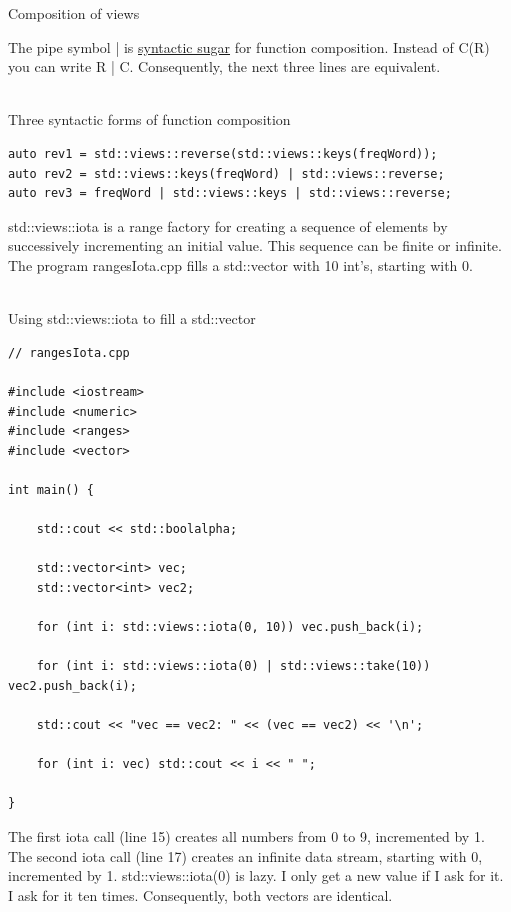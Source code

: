 \begin{center}
Composition of views
\end{center}

The pipe symbol | is \href{https://en.wikipedia.org/wiki/Syntactic_sugar}{syntactic sugar} for function composition. Instead of C(R) you can write R | C. Consequently, the next three lines are equivalent.

\hspace*{\fill} \\ %
\noindent
Three syntactic forms of function composition
\begin{lstlisting}[style=styleCXX]
auto rev1 = std::views::reverse(std::views::keys(freqWord));
auto rev2 = std::views::keys(freqWord) | std::views::reverse;
auto rev3 = freqWord | std::views::keys | std::views::reverse;
\end{lstlisting}


std::views::iota is a range factory for creating a sequence of elements by successively incrementing an initial value. This sequence can be finite or infinite. The program rangesIota.cpp fills a std::vector with 10 int’s, starting with 0.

\hspace*{\fill} \\ %
\noindent
Using std::views::iota to fill a std::vector
\begin{lstlisting}[style=styleCXX]
// rangesIota.cpp

#include <iostream>
#include <numeric>
#include <ranges>
#include <vector>

int main() {
	
	std::cout << std::boolalpha;
	
	std::vector<int> vec;
	std::vector<int> vec2;
	
	for (int i: std::views::iota(0, 10)) vec.push_back(i);
	
	for (int i: std::views::iota(0) | std::views::take(10)) vec2.push_back(i);
	
	std::cout << "vec == vec2: " << (vec == vec2) << '\n';
	
	for (int i: vec) std::cout << i << " ";

}
\end{lstlisting}

The first iota call (line 15) creates all numbers from 0 to 9, incremented by 1. The second iota call (line 17) creates an infinite data stream, starting with 0, incremented by 1. std::views::iota(0) is lazy. I only get a new value if I ask for it. I ask for it ten times. Consequently, both vectors are identical.

